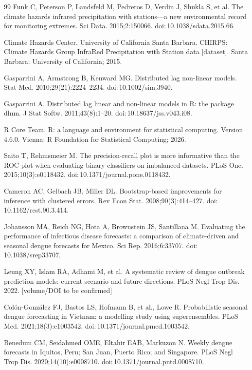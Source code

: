 \documentclass[11pt,a4paper]{article}
\begin{document}
\begin{thebibliography}{99}
 Funk C, Peterson P, Landsfeld M, Pedreros D, Verdin J, Shukla S, et al. The climate hazards infrared precipitation with stations---a new environmental record for monitoring extremes. Sci Data. 2015;2:150066. doi:\,10.1038/sdata.2015.66.

 Climate Hazards Center, University of California Santa Barbara. CHIRPS: Climate Hazards Group InfraRed Precipitation with Station data [dataset]. Santa Barbara: University of California; 2015.

 Gasparrini A, Armstrong B, Kenward MG. Distributed lag non-linear models. Stat Med. 2010;29(21):2224--2234. doi:\,10.1002/sim.3940.

 Gasparrini A. Distributed lag linear and non-linear models in R: the package dlnm. J Stat Softw. 2011;43(8):1--20. doi:\,10.18637/jss.v043.i08.

 R Core Team. R: a language and environment for statistical computing. Version 4.6.0. Vienna: R Foundation for Statistical Computing; 2026.

 Saito T, Rehmsmeier M. The precision-recall plot is more informative than the ROC plot when evaluating binary classifiers on imbalanced datasets. PLoS One. 2015;10(3):e0118432. doi:\,10.1371/journal.pone.0118432.

 Cameron AC, Gelbach JB, Miller DL. Bootstrap-based improvements for inference with clustered errors. Rev Econ Stat. 2008;90(3):414--427. doi:\,10.1162/rest.90.3.414.

 Johansson MA, Reich NG, Hota A, Brownstein JS, Santillana M. Evaluating the performance of infectious disease forecasts: a comparison of climate-driven and seasonal dengue forecasts for Mexico. Sci Rep. 2016;6:33707. doi:\,10.1038/srep33707.

 Leung XY, Islam RA, Adhami M, et al. A systematic review of dengue outbreak prediction models: current scenario and future directions. PLoS Negl Trop Dis. 2022. [volume/DOI to be confirmed]

 Col\'{o}n-Gonz\'{a}lez FJ, Bastos LS, Hofmann B, et al., Lowe R. Probabilistic seasonal dengue forecasting in Vietnam: a modelling study using superensembles. PLoS Med. 2021;18(3):e1003542. doi:\,10.1371/journal.pmed.1003542.

 Benedum CM, Seidahmed OME, Eltahir EAB, Markuzon N. Weekly dengue forecasts in Iquitos, Peru; San Juan, Puerto Rico; and Singapore. PLoS Negl Trop Dis. 2020;14(10):e0008710. doi:\,10.1371/journal.pntd.0008710.


\end{thebibliography}
\end{document}

